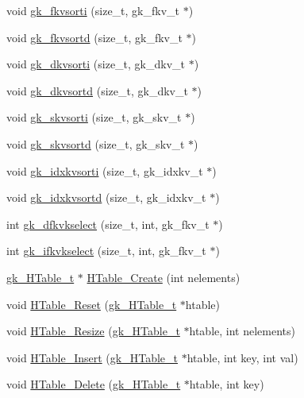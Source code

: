 \begin{DoxyCompactItemize}
\item 
void \hyperlink{a00077_a1d741ae5e6fbe9aeedc02250d5f6fc83}{gk\+\_\+fkvsorti} (size\+\_\+t, gk\+\_\+fkv\+\_\+t $\ast$)
\item 
void \hyperlink{a00077_aa28cb87d9cb87860a5b1e23a94d7bba8}{gk\+\_\+fkvsortd} (size\+\_\+t, gk\+\_\+fkv\+\_\+t $\ast$)
\item 
void \hyperlink{a00077_a463fd9b2f6adc1b05983f90eb398bd10}{gk\+\_\+dkvsorti} (size\+\_\+t, gk\+\_\+dkv\+\_\+t $\ast$)
\item 
void \hyperlink{a00077_ac5138047355892676b7cb38afcfa8361}{gk\+\_\+dkvsortd} (size\+\_\+t, gk\+\_\+dkv\+\_\+t $\ast$)
\item 
void \hyperlink{a00077_ad540fc9b43ce41269f7f33712f5f71c2}{gk\+\_\+skvsorti} (size\+\_\+t, gk\+\_\+skv\+\_\+t $\ast$)
\item 
void \hyperlink{a00077_a54ca33a34b7cfbd130a8af3d8b07405e}{gk\+\_\+skvsortd} (size\+\_\+t, gk\+\_\+skv\+\_\+t $\ast$)
\item 
void \hyperlink{a00077_aacb1df68fc66097ca2646ff5d8be2eaa}{gk\+\_\+idxkvsorti} (size\+\_\+t, gk\+\_\+idxkv\+\_\+t $\ast$)
\item 
void \hyperlink{a00077_a53690cb705b8749f83a8ae609e94aafd}{gk\+\_\+idxkvsortd} (size\+\_\+t, gk\+\_\+idxkv\+\_\+t $\ast$)
\item 
int \hyperlink{a00077_aeb6777a40bd13fe753dedd2871fc8899}{gk\+\_\+dfkvkselect} (size\+\_\+t, int, gk\+\_\+fkv\+\_\+t $\ast$)
\item 
int \hyperlink{a00077_adf2afc6aa313247a04ff5eb828d7e518}{gk\+\_\+ifkvkselect} (size\+\_\+t, int, gk\+\_\+fkv\+\_\+t $\ast$)
\item 
\hyperlink{a00650}{gk\+\_\+\+H\+Table\+\_\+t} $\ast$ \hyperlink{a00077_a8dc2b324b10c45883dacbf58ac0b7efd}{H\+Table\+\_\+\+Create} (int nelements)
\item 
void \hyperlink{a00077_a8a914231592293527bd1f42cdfb346d4}{H\+Table\+\_\+\+Reset} (\hyperlink{a00650}{gk\+\_\+\+H\+Table\+\_\+t} $\ast$htable)
\item 
void \hyperlink{a00077_ad79cb786b03a73481fb3e5846d345801}{H\+Table\+\_\+\+Resize} (\hyperlink{a00650}{gk\+\_\+\+H\+Table\+\_\+t} $\ast$htable, int nelements)
\item 
void \hyperlink{a00077_a39853dc7129323e7846d895c9026ad6f}{H\+Table\+\_\+\+Insert} (\hyperlink{a00650}{gk\+\_\+\+H\+Table\+\_\+t} $\ast$htable, int key, int val)
\item 
void \hyperlink{a00077_a19564e2cf9bc13d7ba8b8d4ed2e9b1d1}{H\+Table\+\_\+\+Delete} (\hyperlink{a00650}{gk\+\_\+\+H\+Table\+\_\+t} $\ast$htable, int key)

\end{DoxyCompactItemize}
